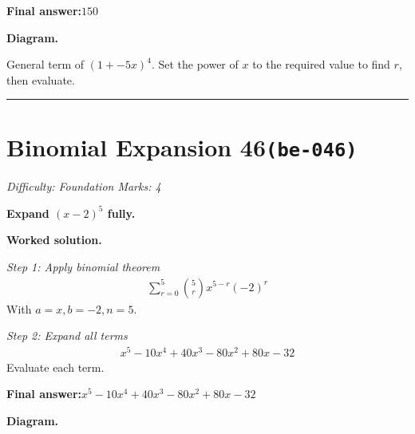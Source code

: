 \documentclass[11pt]{article}
\newcommand{\question}[1]{\par\medskip\noindent\textbf{#1}\par}
\begin{document}
\begin{answerbox}
\textbf{Final answer:}\quad \(\displaystyle 150\)
\end{answerbox}
\textbf{Diagram.}

\begin{center}
\end{center}
\small General term of $\left(1+-5x\right)^{4}$. Set the power of $x$ to the required value to find $r$, then evaluate.\normalsize

\medskip\hrule

\section*{Binomial Expansion 46\quad\small\texttt{(be-046)}}
\textit{Difficulty: Foundation \quad\textbar\quad Marks: 4}

\question{Expand \( (x - 2)^5 \) fully.}

\textbf{Worked solution.}

\textit{Step 1: Apply binomial theorem}
\[\begin{gathered}
\sum_{r=0}^{5} \binom{5}{r} x^{5-r}(-2)^r
\end{gathered}\]
With \( a=x, b=-2, n=5 \).

\textit{Step 2: Expand all terms}
\[\begin{gathered}
x^5 - 10x^4 + 40x^3 - 80x^2 + 80x - 32
\end{gathered}\]
Evaluate each term.

\begin{answerbox}
\textbf{Final answer:}\quad \(\displaystyle x^5 - 10x^4 + 40x^3 - 80x^2 + 80x - 32\)
\end{answerbox}
\textbf{Diagram.}
\end{document}
